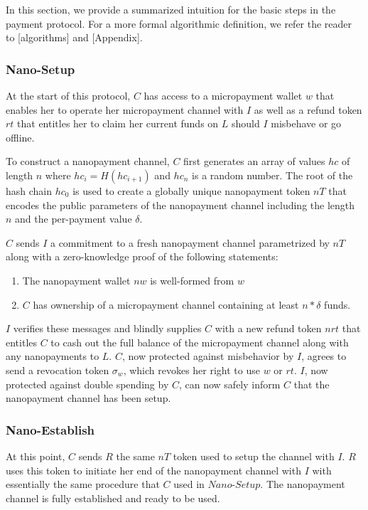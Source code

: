 In this section, we provide a summarized intuition for the basic steps in the
payment protocol. For a more formal algorithmic definition, we refer the reader
to [algorithms] and [Appendix].

\subsubsection{Nano-Setup}

At the start of this protocol, $C$ has access to a micropayment wallet $w$ that
enables her to operate her micropayment channel with $I$ as well as a refund
token $rt$ that entitles her to claim her current funds on $L$ should $I$ misbehave
or go offline.

To construct a nanopayment channel, $C$ first generates an array of values $hc$
of length $n$ where $hc_i = H(hc_{i+1})$ and $hc_n$ is a random number. The root
of the hash chain $hc_0$ is used to create a globally unique nanopayment
token $nT$ that encodes the public parameters of the nanopayment channel
including the length $n$ and the per-payment value $\delta$.

$C$ sends $I$ a commitment to a fresh nanopayment channel parametrized by $nT$ along
with a zero-knowledge proof of the following statements:

\begin{enumerate}
\item The nanopayment wallet $nw$ is well-formed from $w$
\item $C$ has ownership of a micropayment channel containing at least $n *
  \delta$ funds.
\end{enumerate}

$I$ verifies these messages and blindly supplies $C$ with a new refund token $nrt$
that entitles $C$ to cash out the full balance of the micropayment channel along
with any nanopayments to $L$. $C$, now protected against misbehavior by $I$,
agrees to send a revocation token $\sigma_w$, which revokes her right to use $w$
or $rt$. $I$, now protected against double spending by $C$, can now safely
inform $C$ that the nanopayment channel has been setup.

\subsubsection{Nano-Establish}

At this point, $C$ sends $R$ the same $nT$ token used to setup the channel with
$I$. $R$ uses this token to initiate her end of the nanopayment channel with $I$
with essentially the same procedure that $C$ used in $Nano$-$Setup$. The
nanopayment channel is fully established and ready to be used.


